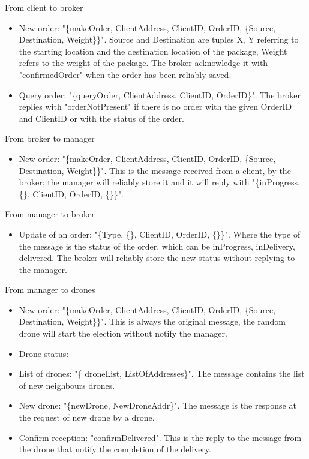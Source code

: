 \documentclass[a4paper, oneside]{memoir}
\begin{document}
From client to broker
\begin{itemize}
	\item New order: "\{makeOrder, ClientAddress, ClientID, OrderID, \{Source, Destination, Weight\}\}".
	Source and Destination are tuples {X, Y} referring to the starting location and the destination location of the package, Weight refers to the weight of the package. The broker acknowledge it with "confirmedOrder" when the order has been reliably saved.

	\item Query order: "\{queryOrder, ClientAddress, ClientID, OrderID\}". The broker replies with "orderNotPresent" if there is no order with the given OrderID and ClientID or with the status of the order.
\end{itemize} \vspace{1em}
From broker to manager
\begin{itemize}
	\item New order: "\{makeOrder, ClientAddress, ClientID, OrderID, \{Source, Destination, Weight\}\}".
	This is the message received from a client, by the broker; the manager will reliably store it and it will reply with "\{inProgress, \{\}, ClientID, OrderID, \{\}\}".
\end{itemize} \vspace{1em}
From manager to broker
\begin{itemize}
	\item Update of an order: "\{Type, \{\}, ClientID, OrderID, \{\}\}".
	Where the type of the message is the status of the order, which can be inProgress, inDelivery, delivered. The broker will reliably store the new status without replying to the manager.
\end{itemize}\vspace{1em}
From manager to drones
\begin{itemize}
	\item New order: "\{makeOrder, ClientAddress, ClientID, OrderID, \{Source, Destination, Weight\}\}".
	This is always the original message, the random drone will start the election without notify the manager.

	\item Drone status:


	\item List of drones: "\{ droneList, ListOfAddresses\}".
	The message contains the list of new neighbours drones.

	\item New drone: "\{newDrone, NewDroneAddr\}".
	The message is the response at the request of new drone by a drone.

	\item Confirm reception: "confirmDelivered".
	This is the reply to the message from the drone that notify the completion of the delivery.

\end{itemize} \vspace{1em}
\end{document}
